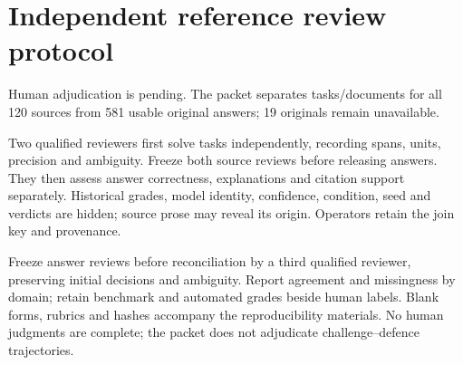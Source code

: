 \section{Independent reference review protocol}
\label{app:reference-adjudication}

Human adjudication is pending. The packet separates tasks/documents for all
120 sources from 581 usable original answers; 19 originals remain unavailable.

Two qualified reviewers first solve tasks independently, recording spans,
units, precision and ambiguity. Freeze both source reviews before releasing
answers. They then assess answer
correctness, explanations and citation support separately. Historical grades,
model identity, confidence, condition, seed and verdicts are hidden; source
prose may reveal its origin. Operators retain the join key and provenance.

Freeze answer reviews before reconciliation by a third qualified reviewer,
preserving initial decisions and ambiguity. Report agreement and missingness by domain; retain
benchmark and automated grades beside human labels. Blank forms, rubrics and
hashes accompany the reproducibility materials. No human judgments are
complete; the packet does not adjudicate challenge--defence trajectories.

